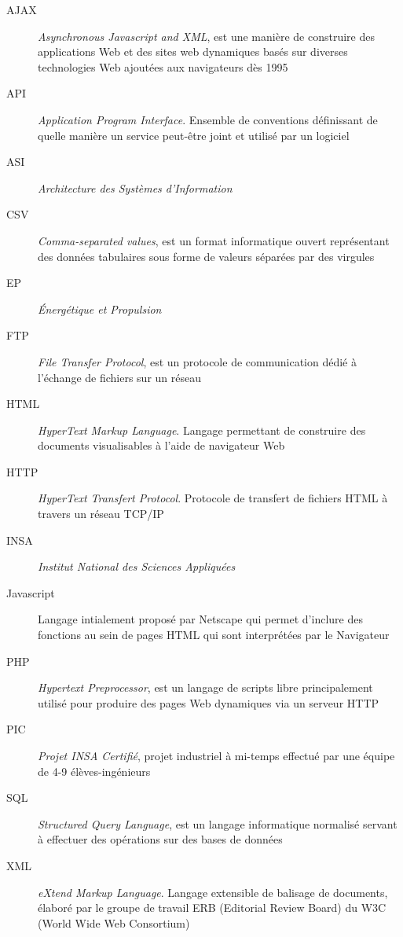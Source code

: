 \documentclass[a4paper,french,12pt]{report}
\begin{document}
\begin{description}
        \item[AJAX] \textsl{Asynchronous Javascript and XML}, est une manière de construire des applications Web et des sites web dynamiques basés sur diverses technologies Web ajoutées aux navigateurs dès 1995
        \item[API] \textsl{Application Program Interface}. Ensemble de conventions définissant de quelle manière un service peut-\^etre joint et utilisé par un logiciel
	\item[ASI] \textsl{Architecture des Systèmes d’Information}
        \item[CSV] \textsl{Comma-separated values}, est un format informatique ouvert représentant des données tabulaires sous forme de valeurs séparées par des virgules
	\item[EP] \textsl{Énergétique et Propulsion}
	\item[FTP] \textsl{File Transfer Protocol}, est un protocole de communication dédié à l’échange de fichiers sur un réseau
        \item[HTML] \textsl{HyperText Markup Language}. Langage permettant de construire des documents visualisables à l'aide de navigateur Web
        \item[HTTP] \textsl{HyperText Transfert Protocol}. Protocole de transfert de fichiers HTML à travers un réseau TCP/IP
        \item[INSA] \textsl{Institut National des Sciences Appliquées}
        \item[Javascript] Langage intialement proposé par Netscape qui permet d'inclure des fonctions au sein de pages HTML qui sont interprétées par le Navigateur
        \item[PHP]  \textsl{Hypertext Preprocessor}, est un langage de scripts libre principalement utilisé pour produire des pages Web dynamiques via un serveur HTTP
        \item[PIC] \textsl{Projet INSA Certifié}, projet industriel à mi-temps effectué par une équipe de 4-9 élèves-ingénieurs
        \item[SQL] \textsl{Structured Query Language}, est un langage informatique normalisé servant à effectuer des opérations sur des bases de données
        \item[XML] \textsl{eXtend Markup Language}. Langage extensible de balisage de documents, élaboré par le groupe de travail ERB (Editorial Review Board) du W3C (World Wide Web Consortium)

\end{description}
\end{document}
